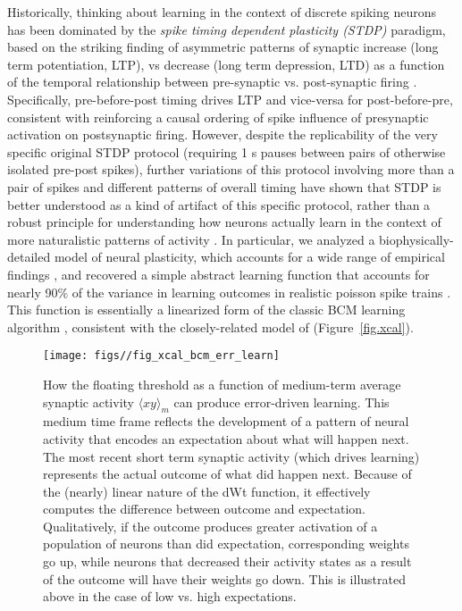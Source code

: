 \documentclass[11pt,twoside]{article}
\newif\myifpdf
\begin{document}
Historically, thinking about learning in the context of discrete spiking neurons has been dominated by the \textit{spike timing dependent plasticity (STDP)} paradigm, based on the striking finding of asymmetric patterns of synaptic increase (long term potentiation, LTP), vs decrease (long term depression, LTD) as a function of the temporal relationship between pre-synaptic vs. post-synaptic firing  \citep{BiPoo98,etc}.  Specifically,  pre-before-post timing drives LTP and vice-versa for post-before-pre, consistent with reinforcing a causal ordering of spike influence of presynaptic activation on postsynaptic firing.  However, despite the replicability of the very specific original STDP protocol (requiring 1 s pauses between pairs of otherwise isolated pre-post spikes), further variations of this protocol involving more than a pair of spikes and different patterns of overall timing have shown that STDP is better understood as a kind of artifact of this specific protocol, rather than a robust principle for understanding how neurons actually learn in the context of more naturalistic patterns of activity \citep{ShouvalWangWittenberg10}.  In particular, we analyzed a biophysically-detailed model of neural plasticity, which accounts for a wide range of empirical findings \citep{UrakuboHondaFroemkeEtAl08}, and recovered a simple abstract learning function that accounts for nearly 90\% of the variance in learning outcomes in realistic poisson spike trains \citep{OReillyMunakataFrankEtAl12}.  This function is essentially a linearized form of the classic BCM learning algorithm \citep{BienenstockCooperMunro82}, consistent with the closely-related model of \citet{ShouvalWangWittenberg10} (Figure~\ref{fig.xcal}).

\begin{figure}
  \centering\texttt{[image: figs//fig\_xcal\_bcm\_err\_learn]}
  \caption{\footnotesize  How the floating threshold as a function of medium-term average synaptic activity $\langle x y \rangle_m$ can produce error-driven learning. This medium time frame reflects the development of a pattern of neural activity that encodes an expectation about what will happen next. The most recent short term synaptic activity (which drives learning) represents the actual outcome of what did happen next. Because of the (nearly) linear nature of the dWt function, it effectively computes the difference between outcome and expectation. Qualitatively, if the outcome produces greater activation of a population of neurons than did expectation, corresponding weights go up, while neurons that decreased their activity states as a result of the outcome will have their weights go down. This is illustrated above in the case of low vs. high expectations.}
  \label{fig.xcal_err}
\end{figure}
\end{document}

